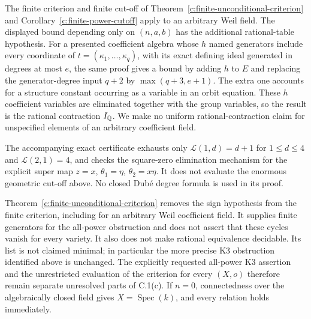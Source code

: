 \begin{remark}
\label{c:uniform-arity-scope}
The finite criterion and finite cut-off of
Theorem~\ref{c:finite-unconditional-criterion} and
Corollary~\ref{c:finite-power-cutoff} apply to an arbitrary
Weil field.  The displayed bound depending only on $(n,a,b)$
has the additional rational-table hypothesis.  For a presented
coefficient algebra whose $h$ named generators include every
coordinate of $t=(\kappa_1,\ldots,\kappa_q)$, with its exact
defining ideal generated in degrees at most $e$, the same proof gives a bound by adding
$h$ to $E$ and replacing the generator-degree input $q+2$
by $\max(q+3,e+1)$.  The extra one accounts for a structure
constant occurring as a variable in an orbit equation.  These
$h$ coefficient variables are eliminated together with the group
variables, so the result is the rational contraction $I_\mathbb Q$.
We make no uniform rational-contraction claim for unspecified
elements of an arbitrary coefficient field.

The accompanying exact certificate exhausts only
$\mathcal L(1,d)=d+1$ for $1\leq d\leq4$ and
$\mathcal L(2,1)=4$, and checks the square-zero elimination
mechanism for the explicit super map
$z=x$, $\theta_1=\eta$, $\theta_2=x\eta$.
It does not evaluate the enormous geometric cut-off above.
No closed Dub\'e degree formula is used in its proof.
\end{remark}


\begin{remark}
\label{c:finite-unconditional-scope}
Theorem~\ref{c:finite-unconditional-criterion} removes the sign
hypothesis from the finite criterion, including for an arbitrary
Weil coefficient field.  It supplies finite generators for the
all-power obstruction and does not assert that these cycles
vanish for every variety.  It also does not make rational
equivalence decidable.  Its list is not claimed minimal; in
particular the more precise K3 obstruction identified above is
unchanged.  The explicitly requested all-power K3 assertion and
the unrestricted evaluation of the criterion for every $(X,o)$
therefore remain separate unresolved parts of C.1(c).
If $n=0$, connectedness over the algebraically closed field gives
$X=\operatorname{Spec}(k)$, and every relation holds immediately.
\end{remark}


